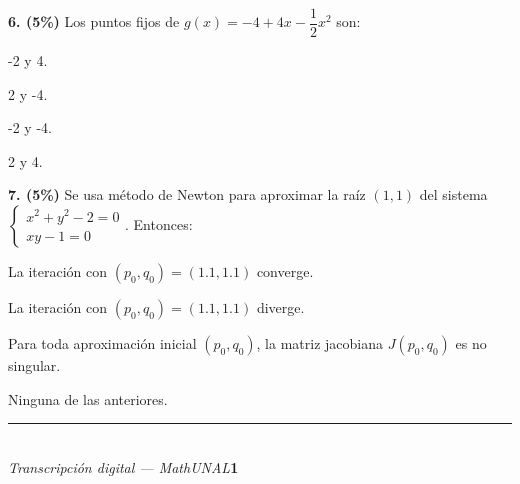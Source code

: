 \documentclass[11pt]{article}
\begin{document}
\vspace{0.3cm}
\noindent\textbf{6. (5\%)} Los puntos fijos de $g(x)=-4+4x-\dfrac12x^2$ son:
\begin{opciones}
\item -2 y 4.
\item 2 y -4.
\item -2 y -4.
\item 2 y 4.
\end{opciones}

\vspace{0.3cm}
\noindent\textbf{7. (5\%)} Se usa método de Newton para aproximar la raíz $(1,1)$ del sistema $\begin{cases}x^2+y^2-2=0\\xy-1=0\end{cases}$. Entonces:
\begin{opciones}
\item La iteración con $(p_0,q_0)=(1.1,1.1)$ converge.
\item La iteración con $(p_0,q_0)=(1.1,1.1)$ diverge.
\item Para toda aproximación inicial $(p_0,q_0)$, la matriz jacobiana $J(p_0,q_0)$ es no singular.
\item Ninguna de las anteriores.
\end{opciones}

\vfill
\rule{\linewidth}{0.4pt}\\[1pt]
{\scriptsize\textit{Transcripción digital --- MathUNAL}\hfill\textcolor{unalblue}{\textbf{1}}}
\end{document}
